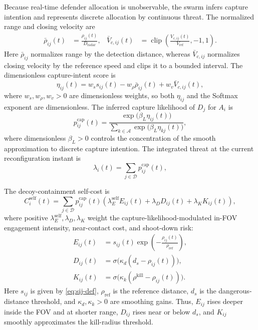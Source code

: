 \documentclass{cja}
\begin{document}
Because real-time defender allocation is unobservable, the swarm infers capture intention and represents discrete allocation by continuous threat. The normalized range and closing velocity are
\begin{equation}
\begin{aligned}
\bar\rho_{ij}(t)
&=\frac{\rho_{ij}(t)}{D_{\mathrm{radar}}},&
\bar V_{c,ij}(t)
&=\operatorname{clip}\!\left(
\frac{V_{c,ij}(t)}{V_{\mathrm{ref}}},
-1,1
\right).
\end{aligned}
\end{equation}
Here $\bar\rho_{ij}$ normalizes range by the detection distance, whereas $\bar V_{c,ij}$ normalizes closing velocity by the reference speed and clips it to a bounded interval.
The dimensionless capture-intent score is
\begin{equation}
\eta_{ij}(t)
=
w_s s_{ij}(t)
-
w_{\rho}\bar\rho_{ij}(t)
+
w_v \bar V_{c,ij}(t),
\end{equation}
where $w_s,w_{\rho},w_v>0$ are dimensionless weights, so both $\eta_{ij}$ and the Softmax exponent are dimensionless. The inferred capture likelihood of $D_j$ for $A_i$ is
\begin{equation}
p_{ij}^{\mathrm{cap}}(t)
=
\frac{\exp\!\bigl(\beta_L \eta_{ij}(t)\bigr)}
{\sum\limits_{k\in\mathcal{A}}\exp\!\bigl(\beta_L \eta_{kj}(t)\bigr)},
\label{eq:soft-lock-prob}
\end{equation}
where dimensionless $\beta_L>0$ controls the concentration of the smooth approximation to discrete capture intention. The integrated threat at the current reconfiguration instant is
\begin{equation}
\lambda_i(t)
=
\sum_{j\in\mathcal D}p_{ij}^{\mathrm{cap}}(t),
\label{eq:soft-lock-pressure}
\end{equation}

The decoy-containment self-cost is
\begin{equation}
C_i^{\mathrm{self}}(t)
=
\sum_{j\in\mathcal{D}}
p_{ij}^{\mathrm{cap}}(t)
\left(
\lambda_E^{\mathrm{self}} E_{ij}(t)
+
\lambda_D D_{ij}(t)
+
\lambda_K K_{ij}(t)
\right),
\end{equation}
where positive $\lambda_E^{\mathrm{self}},\lambda_D,\lambda_K$ weight the capture-likelihood-modulated in-FOV engagement intensity, near-contact cost, and shoot-down risk:
\begin{equation}
\begin{aligned}
E_{ij}(t)
&=s_{ij}(t)\exp\!\left(-\frac{\rho_{ij}(t)}{\rho_{\mathrm{ref}}}\right),\\
D_{ij}(t)
&=\sigma\!\bigl(\kappa_d(d_s-\rho_{ij}(t))\bigr),\\
K_{ij}(t)
&=\sigma\!\bigl(\kappa_k(\rho^{\mathrm{kill}}-\rho_{ij}(t))\bigr).
\end{aligned}
\end{equation}
Here $s_{ij}$ is given by \eqref{eq:sij-def}, $\rho_{\mathrm{ref}}$ is the reference distance, $d_s$ is the dangerous-distance threshold, and $\kappa_d,\kappa_k>0$ are smoothing gains. Thus, $E_{ij}$ rises deeper inside the FOV and at shorter range, $D_{ij}$ rises near or below $d_s$, and $K_{ij}$ smoothly approximates the kill-radius threshold.
\end{document}
